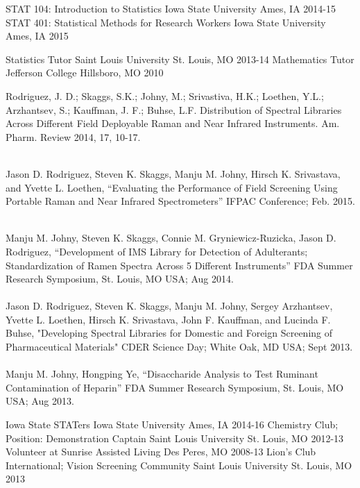 \documentclass[11pt, a4paper]{awesome-cv}
\begin{document}
\begin{cvhonors}
  \cvhonor
    {STAT 104: Introduction to Statistics}
    {Iowa State University}
    {Ames, IA}
    {2014-15}
  \cvhonor
    {STAT 401: Statistical Methods for Research Workers}
    {Iowa State University}
    {Ames, IA}
    {2015}
 \end{cvhonors}
  \begin{cvhonors}
  \cvhonor
    {Statistics Tutor}
    {Saint Louis University}
    {St. Louis, MO}
    {2013-14}
  \cvhonor
    {Mathematics Tutor}
    {Jefferson College}
    {Hillsboro, MO}
    {2010}
 \end{cvhonors}
 
\small{Rodriguez, J. D.; Skaggs, S.K.; Johny, M.; Srivastiva, H.K.; Loethen, Y.L.; Arzhantsev, S.; Kauffman, J. F.; Buhse, L.F.  Distribution of Spectral Libraries Across Different Field Deployable Raman and Near Infrared Instruments. Am. Pharm. Review 2014, 17, 10-17.}
 
\\
\small{
Jason D. Rodriguez, Steven K. Skaggs, Manju M. Johny, Hirsch K. Srivastava, and Yvette L. Loethen, “Evaluating the Performance of Field Screening Using Portable Raman and Near Infrared Spectrometers” IFPAC Conference; Feb. 2015.
}

\\
\small{
Manju M. Johny, Steven K. Skaggs, Connie M. Gryniewicz-Ruzicka, Jason D. Rodriguez, “Development of IMS Library for Detection of Adulterants; Standardization of Ramen Spectra Across 5 Different Instruments” FDA Summer Research Symposium, St. Louis, MO USA; Aug 2014.
\\\\ 
Jason D. Rodriguez, Steven K. Skaggs, Manju M. Johny, Sergey Arzhantsev, Yvette L. Loethen, Hirsch K. Srivastava, John F. Kauffman, and Lucinda F. Buhse, "Developing Spectral Libraries for Domestic and Foreign Screening of Pharmaceutical Materials" CDER Science Day; White Oak, MD USA; Sept 2013.
\\\\
Manju M. Johny, Hongping Ye, “Disaccharide Analysis to Test Ruminant Contamination of Heparin” FDA Summer Research Symposium, St. Louis, MO USA; Aug 2013.
}

  \begin{cvhonors}
  \cvhonor
    {Iowa State STATers}
    {Iowa State University}
    {Ames, IA}
    {2014-16}
  \cvhonor
    {Chemistry Club; Position: Demonstration Captain}
    {Saint Louis University}
    {St. Louis, MO}
    {2012-13}
  \cvhonor
    {Volunteer at Sunrise Assisted Living}
    {}
    {Des Peres, MO}
    {2008-13}
  \cvhonor
    {Lion's Club International; Vision Screening Community}
    {Saint Louis University}
    {St. Louis, MO}
    {2013}
 \end{cvhonors}
\end{document}
